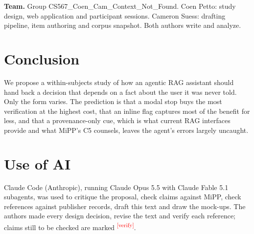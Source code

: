 \documentclass[sigconf,nonacm]{acmart}
\newcommand{\verify}{\textsuperscript{\textcolor{red}{[verify]}}}
\begin{document}
\textbf{Team.} Group CS567\_Coen\_Cam\_Context\_Not\_Found. Coen Petto:
study design, web application and participant sessions. Cameron Suess:
drafting pipeline, item authoring and corpus snapshot. Both authors write
and analyze.

\section{Conclusion}

We propose a within-subjects study of how an agentic RAG assistant should
hand back a decision that depends on a fact about the user it was never
told. Only the form varies. The prediction is that a modal
stop buys the most verification at the highest cost, that an inline flag
captures most of the benefit for less, and that a provenance-only cue,
which is what current RAG interfaces provide and what MiPP's C5 counsels,
leaves the agent's errors largely uncaught.

\section*{Use of AI}

Claude Code (Anthropic), running Claude Opus 5.5 with Claude Fable 5.1
subagents, was used to critique the proposal, check claims against MiPP,
check references against publisher records, draft this text and draw the
mock-ups. The authors made every design decision, revise the text and
verify each reference; claims still to be checked are marked \verify.



\end{document}
